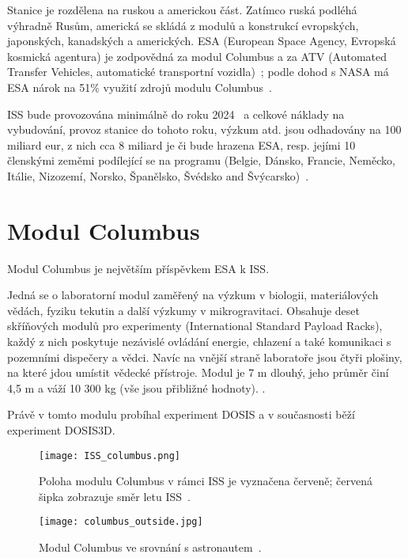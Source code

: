 Stanice je rozdělena na ruskou a americkou část. Zatímco ruská podléhá výhradně Rusům, americká se skládá z modulů a konstrukcí evropských, japonských, kanadských a amerických. ESA (European Space Agency, Evropská kosmická agentura) je zodpovědná za modul Columbus a za ATV (Automated Transfer Vehicles, automatické transportní vozidla)~\cite{ISS_about}; podle dohod s NASA má ESA nárok na 51\% využití zdrojů modulu Columbus~\cite{ISS_wiki}.

ISS bude provozována minimálně do roku 2024~\cite{ISS_prodlouzeni} a celkové náklady na vybudování, provoz stanice do tohoto roku, výzkum atd. jsou odhadovány na 100 miliard eur, z nich cca 8 miliard je či bude hrazena ESA, resp. jejími 10 členskými zeměmi podílející se na programu (Belgie, Dánsko, Francie, Neměcko, Itálie, Nizozemí, Norsko, Španělsko, Švédsko and Švýcarsko)~\cite{ISS_cost}.
\section{Modul Columbus}\label{sec:ISS_columbus}
Modul Columbus je největším příspěvkem ESA k ISS.

Jedná se o laboratorní modul zaměřený na výzkum v biologii, materiálových vědách, fyziku tekutin a další výzkumy v mikrogravitaci. Obsahuje deset skříňových modulů pro experimenty (International Standard Payload Racks), každý z nich poskytuje nezávislé ovládání energie, chlazení a také komunikaci s pozemními dispečery a vědci. Navíc na vnější straně laboratoře jsou čtyři plošiny, na které jdou umístit vědecké přístroje. Modul je 7 m dlouhý, jeho průměr činí 4,5 m a váží 10 300 kg (vše jsou přibližné hodnoty). \cite{columbus}.

Právě v tomto modulu probíhal experiment DOSIS a v současnosti běží experiment DOSIS3D. 
\begin{figure}[H]
  \centering
  \texttt{[image: ISS\_columbus.png]}
  \caption{Poloha modulu Columbus v rámci ISS je vyznačena červeně; červená šipka zobrazuje směr letu ISS~\cite{dosis}.}
  \label{fig:columbus_poloha}
\end{figure}
\begin{figure}[H]
  \centering
  \texttt{[image: columbus\_outside.jpg]}
  \caption{Modul Columbus ve srovnání s astronautem~\cite{columbus_outside}.}
  \label{fig:columbus_srovnani}
\end{figure}

